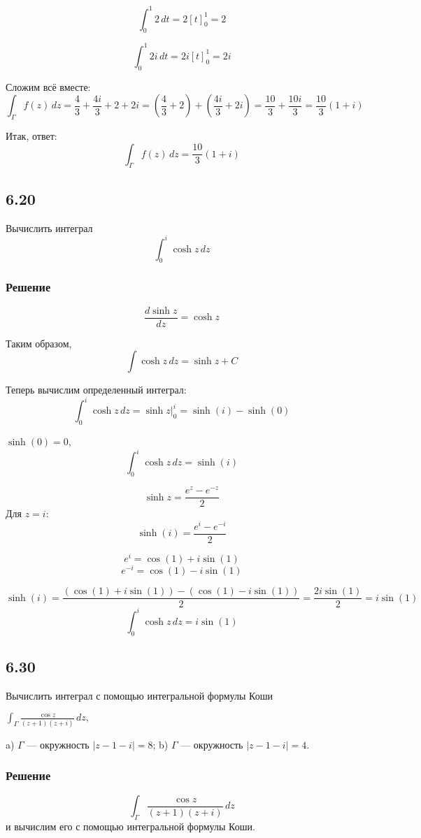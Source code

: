 \documentclass[12pt,a4paper]{article}
\begin{document}
\[
\int_0^1 2 \, dt = 2 \left[ t \right]_0^1 = 2
\]

\[
\int_0^1 2i \, dt = 2i \left[ t \right]_0^1 = 2i
\]

Сложим всё вместе:
\[
\int_\Gamma f(z) \, dz = \frac{4}{3} + \frac{4i}{3} + 2 + 2i = \left( \frac{4}{3} + 2 \right) + \left( \frac{4i}{3} + 2i \right) = \frac{10}{3} + \frac{10i}{3} = \frac{10}{3}(1 + i)
\]

Итак, ответ:
\[
\int_\Gamma f(z) \, dz = \frac{10}{3}(1 + i)
\]
\subsection*{6.20}
Вычислить интеграл
\[
\int_{0}^{i} \cosh z \, dz
\]
\subsubsection*{Решение}

\[
\frac{d\sinh z}{dz}  = \cosh z
\]

Таким образом,
\[
\int \cosh z \, dz = \sinh z + C
\]

Теперь вычислим определенный интеграл:
\[
\int_{0}^{i} \cosh z \, dz = \left. \sinh z \right|_{0}^{i} = \sinh(i) - \sinh(0)
\]

\(\sinh(0) = 0\),
\[
\int_{0}^{i} \cosh z \, dz = \sinh(i)
\]

\[
\sinh z = \frac{e^z - e^{-z}}{2}
\]
Для \(z = i\):
\[
\sinh(i) = \frac{e^i - e^{-i}}{2}
\]

\[
e^i = \cos(1) + i\sin(1)
\]
\[
e^{-i} = \cos(1) - i\sin(1)
\]

\[
\sinh(i) = \frac{(\cos(1) + i\sin(1)) - (\cos(1) - i\sin(1))}{2} = \frac{2i\sin(1)}{2} = i\sin(1)
\]
\[
\int_{0}^{i} \cosh z \, dz = i\sin(1)
\]
\subsection*{6.30}
Вычислить интеграл с помощью интегральной формулы Коши

\(\int_{\Gamma} \frac{\cos z}{(z + 1)(z + i)} \, dz,\)

a) \(\Gamma\) --- окружность \(|z - 1 - i| = 8\); \quad b) \(\Gamma\) --- окружность \(|z - 1 - i| = 4\).

\subsubsection*{Решение}
\[
\int_{\Gamma} \frac{\cos z}{(z + 1)(z + i)} \, dz
\]
и вычислим его с помощью интегральной формулы Коши.
\end{document}
